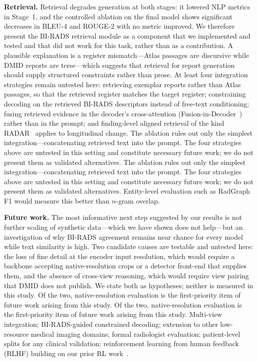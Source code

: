 \documentclass{wlscirep}
\newif\ifmarkup
\newif\ifmarkbar
\newcommand{\rev}[1]{%
  \ifmarkup
    \ifmarkbar\cbstart#1\cbend\else\textcolor{revised}{#1}\fi
  \else#1\fi}
\begin{document}
\textbf{Retrieval.} Retrieval degrades generation at both stages: it lowered NLP metrics in Stage~1, and the controlled ablation on the final model shows significant decreases in BLEU-4 and ROUGE-2 with no metric improved. We therefore present the BI-RADS retrieval module as a component that we implemented and tested and that did not work for this task, rather than as a contribution. A plausible explanation is a register mismatch---Atlas passages are discursive while DMID reports are terse---which suggests that retrieval for report generation should supply structured constraints rather than prose. At least four integration strategies remain untested here: retrieving exemplar reports rather than Atlas passages, so that the retrieved register matches the target register; constraining decoding on the retrieved BI-RADS descriptors instead of free-text conditioning; fusing retrieved evidence in the decoder's cross-attention (Fusion-in-Decoder~\cite{izacard2021fid}) rather than in the prompt; and finding-level aligned retrieval of the kind RADAR~\cite{pan2026radar} applies to longitudinal change. \rev{The ablation rules out only the simplest integration---concatenating retrieved text into the prompt. The four strategies above are untested in this setting and constitute necessary future work; we do not present them as validated alternatives.} Entity-level evaluation such as RadGraph F1 would measure this better than $n$-gram overlap.

\textbf{Future work.} The most informative next step suggested by our results is not further scaling of synthetic data---which we have shown does not help---but an investigation of why BI-RADS agreement remains near chance for every model while text similarity is high. Two candidate causes are testable and untested here: the loss of fine detail at the encoder input resolution, which would require a backbone accepting native-resolution crops or a detector front-end that supplies them, and the absence of cross-view reasoning, which would require view pairing that DMID does not publish. We state both as hypotheses; neither is measured in this study. \rev{Of the two, native-resolution evaluation is the first-priority item of future work arising from this study.} Multi-view integration; BI-RADS-guided constrained decoding; extension to other low-resource medical imaging domains; formal radiologist evaluation; patient-level splits for any clinical validation; reinforcement learning from human feedback (RLHF) building on our prior RL work~\cite{esen2025rl}.
\end{document}
